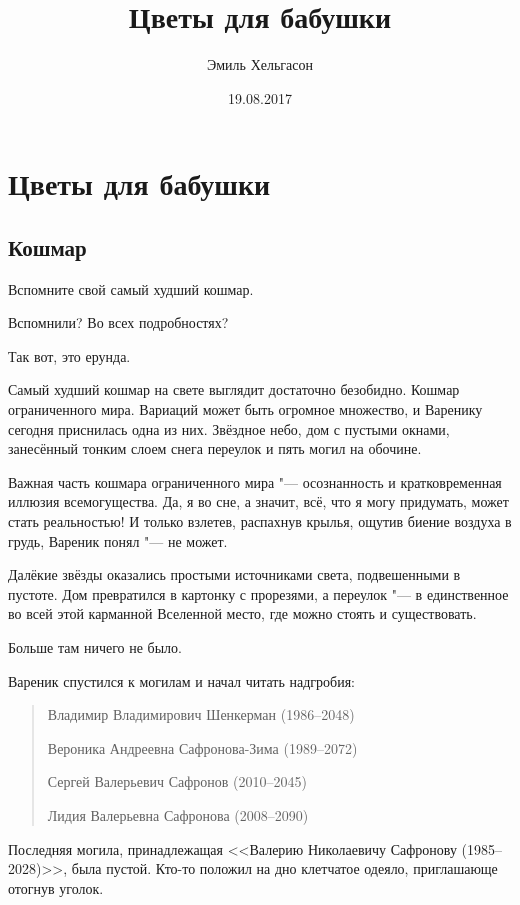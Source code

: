 \author{Эмиль Хельгасон}
\title{Цветы для бабушки}
\date{19.08.2017}
\maketitle

\tableofcontents

\chapter{Цветы для бабушки}

\section{Кошмар}

Вспомните свой самый худший кошмар.

Вспомнили?
Во всех подробностях?

Так вот, это ерунда.

Самый худший кошмар на свете выглядит достаточно безобидно.
Кошмар ограниченного мира.
Вариаций может быть огромное множество, и Варенику сегодня приснилась одна из них.
Звёздное небо, дом с пустыми окнами, занесённый тонким слоем снега переулок и пять могил на обочине.

Важная часть кошмара ограниченного мира "--- осознанность и кратковременная иллюзия всемогущества.
Да, я во сне, а значит, всё, что я могу придумать, может стать реальностью!
И только взлетев, распахнув крылья, ощутив биение воздуха в грудь, Вареник понял "--- не может.

Далёкие звёзды оказались простыми источниками света, подвешенными в пустоте.
Дом превратился в картонку с прорезями, а переулок "--- в единственное во всей этой карманной Вселенной место, где можно стоять и существовать.

Больше там ничего не было.

Вареник спустился к могилам и начал читать надгробия:

\begin{quote}
Владимир Владимирович Шенкерман (1986--2048)

Вероника Андреевна Сафронова-Зима (1989--2072)

Сергей Валерьевич Сафронов (2010--2045)

Лидия Валерьевна Сафронова (2008--2090)
\end{quote}

Последняя могила, принадлежащая <<Валерию Николаевичу Сафронову (1985--2028)>>, была пустой.
Кто-то положил на дно клетчатое одеяло, приглашающе отогнув уголок.

